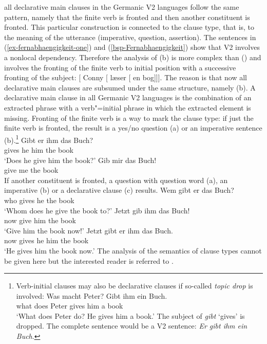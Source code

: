 all declarative main clauses in the Germanic V2 languages follow the same pattern, namely that the
finite verb is fronted and then another constituent is fronted. This particular construction is
connected to the clause type, that is, to the meaning of the utterance (imperative, question,
assertion). The sentences in (\ref{ex-fernabhaengigkeit-one}) and (\ref{bsp-Fernabhaengigkeit}) show
that V2 involves a nonlocal dependency. Therefore the analysis
of (b) is more complex than () and involves the fronting of the finite verb to initial
position with a successive fronting of the subject:
\ea
{}[ Conny [ læser [ en bog]]].
\z
The reason is that now all declarative main clauses are subsumed under the same structure, namely
(b). A declarative main clause in all Germanic V2 languages is the combination of an extracted
phrase with a verb"=initial phrase in which the extracted element is missing. Fronting of the finite
verb is a way to mark the clause type: if just the finite verb is fronted, the result is a yes/no question (a)
or an imperative sentence (b).\footnote{
  Verb-initial clauses may also be declarative clauses if so-called \emph{topic drop} \citep{Fries88b} is involved:
  \ea
  \gll Was macht Peter? Gibt ihm ein Buch.\\
       what does Peter  gives him a book\\\german
  \glt `What does Peter do? He gives him a book.'
  \z
  The subject of \emph{gibt} `gives' is dropped. The complete sentence would be a V2 sentence:
  \emph{Er gibt ihm ein Buch}.
}
\eal
\ex 
\gll Gibt er ihm das Buch?\\
     gives he him the book\\\german
\glt `Does he give him the book?'
\ex 
\gll Gib mir das Buch!\\
     give me the book\\
\zl
If another constituent is fronted, a question with question word (a), an imperative
(b) or a declarative clause (c) results.
\eal
\ex 
\gll Wem gibt er das Buch?\\
     who gives he the book\\\german
\glt `Whom does he give the book to?'
\ex 
\gll Jetzt gib ihm das Buch!\\
     now give him the book\\
\glt `Give him the book now!'
\ex 
\gll Jetzt gibt er ihm das Buch.\\
     now gives he him the book\\
\glt `He gives him the book now.'
\zl
The analysis of the semantics of clause types cannot be given here but the interested reader is
referred to .


